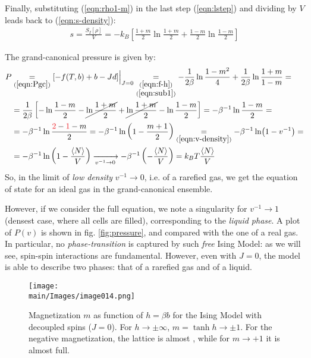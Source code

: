 \documentclass[../../main.tex]{subfiles}
\begin{document}
\begin{example}
    \medskip

    Finally, substituting (\ref{eqn:rho1-m}) in the last step (\ref{eqn:lstep}) and dividing by $V$ leads back to (\ref{eqn:s-density}):
    \begin{align}\label{eqn:lstepb}
        s = \frac{S_I[\rho]}{V} = -k_B\left[\frac{1+m}{2} \ln \frac{1+m}{2} + \frac{1-m}{2} \ln \frac{1-m}{2} \right] 
    \end{align}

    The grand-canonical pressure is given by:
    \begin{align*}
        P &\underset{(\ref{eqn:Pgc})}{=}  [-f(T,b) + b - Jd]\Big|_{J=0} \underset{\substack{(\ref{eqn:f-h})\\(\ref{eqn:sub1})}}{=} -\frac{1}{2\beta} \ln \frac{1-m^2}{4} + \frac{1}{2\beta} \ln \frac{1+m}{1-m} = \\
        &=\frac{1}{2\beta} \left[-\ln \frac{1-m}{2} -\cancel{ \ln \frac{1+m}{2}} + \cancel{\ln \frac{1+m}{2} }- \ln \frac{1-m}{2}    \right] = -\beta^{-1} \ln \frac{1-m}{2} =\\
        &=-\beta^{-1} \ln \frac{\textcolor{Red}{2} - \textcolor{Red}{1}-m}{2} = -\beta^{-1} \ln\left(1-\frac{m+1}{2} \right) \underset{(\ref{eqn:v-density})}{=} -\beta^{-1} \ln(1- v^{-1}) =\\
        &= - \beta^{-1} \ln \left(1-\frac{\langle N \rangle}{V} \right) \xrightarrow[v^{-1} \to 0]{} -\beta^{-1} \left(-\frac{\langle N \rangle}{V}\right) = k_B T \frac{\langle N \rangle}{V} 
    \end{align*}
    So, in the limit of \textit{low density} $v^{-1} \to 0$, i.e. of a rarefied gas, we get the equation of state for an ideal gas in the grand-canonical ensemble.

    \medskip

    However, if we consider the full equation, we note a singularity for $v^{-1} \to 1$ (densest case, where all cells are filled), corresponding to the \textit{liquid phase}. A plot of $P(v)$ is shown in fig. \ref{fig:pressure}, and compared with the one of a real gas. In particular, no \textit{phase-transition} is captured by such \textit{free} Ising Model: as we will see, spin-spin interactions are fundamental. However, even with $J=0$, the model is able to describe two phases: that of a rarefied gas and of a liquid.
\end{example}

\begin{figure}[H]
    \centering
    \texttt{[image: \\main/Images/image014.png]}
    \caption{Magnetization $m$ as function of $h = \beta b$ for the Ising Model with decoupled spins ($J=0$). For $h \to \pm \infty$, $m = \tanh h \to \pm 1$. For the negative magnetization, the lattice is almost , while for $m \to +1$ it is almost full.
    \label{fig:free-spin-m}} 
\end{figure} 
\end{document}

